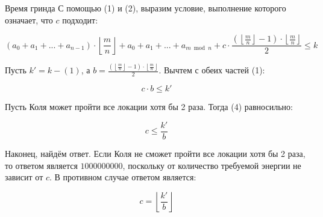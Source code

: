 \begin{tutorial}{Время гринда}
С помощью (1) и (2), выразим условие, выполнение которого означает, что $c$ подходит:

\begin{equation}
\left( a_0 + a_1 + ... + a_{n-1} \right) \cdot \left\lfloor \frac{m}{n} \right\rfloor + a_0 + a_1 + ... + a_{m \bmod{n}} + c \cdot \frac{\left( \left\lfloor \frac{m}{n} \right\rfloor - 1 \right) \cdot \left\lfloor \frac{m}{n} \right\rfloor}{2} \leq k %
\end{equation}

Пусть $k' = k - \left( 1 \right)$, а $b = \frac{\left( \left\lfloor \frac{m}{n} \right\rfloor - 1 \right) \cdot \left\lfloor \frac{m}{n} \right\rfloor}{2}$. Вычтем с обеих частей (1):

\begin{equation}
c \cdot b \leq k' %
\end{equation}

Пусть Коля может пройти все локации хотя бы 2 раза. Тогда (4) равносильно:

\begin{equation}
c \leq \frac{k'}{b} %
\end{equation}

Наконец, найдём ответ. Если Коля не сможет пройти все локации хотя бы 2 раза, то ответом является $1000000000$, поскольку от количество требуемой энергии не зависит от $c$. В противном случае ответом является:

\begin{equation}
c = \left\lfloor \frac{k'}{b} \right\rfloor %
\end{equation}

\end{tutorial}
